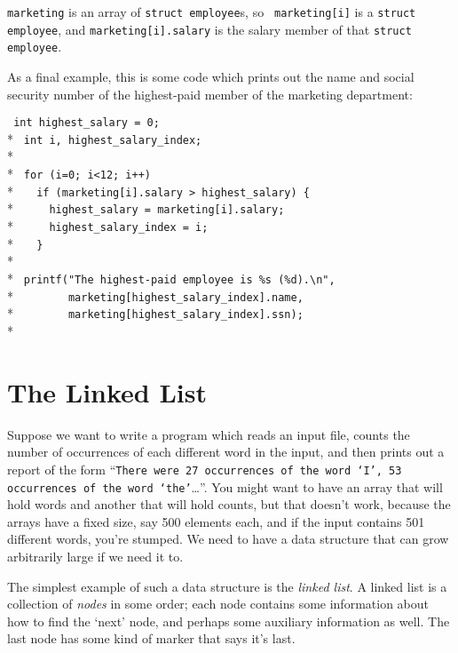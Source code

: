 {\tt marketing} is an array of {\tt struct employee}s, so {\tt
marketing[i]} is a {\tt struct employee}, and {\tt marketing[i].salary}
is the salary member of that {\tt struct employee}. 

As a final example, this is some code which prints out the name and
social security number of the highest-paid member of the marketing
department: 

\begin{flushleft}
\verb! int highest_salary = 0;! \\*
\verb! int i, highest_salary_index; ! \\*
\verb! ! \\*
\verb! for (i=0; i<12; i++) ! \\*
\verb!   if (marketing[i].salary > highest_salary) {! \\*
\verb!     highest_salary = marketing[i].salary;! \\*
\verb!     highest_salary_index = i;! \\*
\verb!   }! \\*
\verb! ! \\*
\verb! printf("The highest-paid employee is %s (%d).\n", ! \\*
\verb!        marketing[highest_salary_index].name, ! \\*
\verb!        marketing[highest_salary_index].ssn); ! \\*
\end{flushleft}

\section{The Linked List}

Suppose we want to write a program which reads an input file, counts the
number of occurrences of each different word in the input, and then
prints out a report of the form ``{\tt There were 27 occurrences of the
word `I', 53 occurrences of the word `the'}\ldots''. You might want to
have an array that will hold words and another that will hold counts,
but that doesn't work, because the arrays have a fixed size, say 500
elements each, and if the input contains 501 different words, you're
stumped.  We need to have a data structure that can grow arbitrarily
large if we need it to. 

The simplest example of such a data structure is the {\em linked
list}\/.  A linked list is a collection of {\em nodes} in some order;
each node contains some information about how to find the `next' node,
and perhaps some auxiliary information as well.  The last node has some
kind of marker that says it's last.

